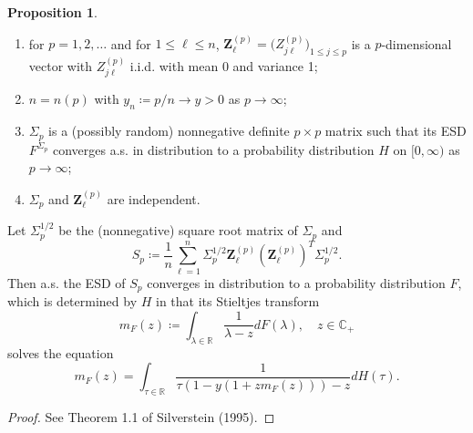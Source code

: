 \documentclass[a4paper,11pt]{book}
\theoremstyle{plain}
\theoremstyle{definition}
\newtheorem{prps}[thm]{Proposition}
\newcommand{\MR}{\mathbb{R}}
\begin{document}
	\begin{prps}\label{MP law} \
		\begin{enumerate}
			\item for $p = 1, 2, \dots$ and for $1 \leq \ell \leq n$, $\mathbf{Z}_{\ell}^{(p)} = \big(Z_{j\ell}^{(p)}\big)_{1 \leq j \leq p}$ is a $p$-dimensional vector with $Z_{j\ell}^{(p)}$ i.i.d. with mean 0 and variance 1;
			\item $n = n(p)$ with $y_n \coloneqq p/n \rightarrow y > 0$ as $p \rightarrow \infty$;
			\item $\Sigma_p$ is a (possibly random) nonnegative definite $p \times p$ matrix such that its ESD $F^{\Sigma_p}$ converges a.s. in distribution to a probability distribution $H$ on $[0,\infty)$ as $p \rightarrow \infty$;
			\item $\Sigma_p$ and $\mathbf{Z}_\ell^{(p)}$ are independent.
		\end{enumerate}
		Let $\Sigma_p^{1/2}$ be the (nonnegative) square root matrix of $\Sigma_p$ and 
		\[S_p\coloneqq \frac{1}{n} \sum_{\ell=1}^{n} \Sigma_p^{1/2} \mathbf{Z}_\ell^{(p)}(\mathbf{Z}_\ell^{(p)})^T \Sigma_p^{1/2}.\]
		Then a.s. the ESD of $S_p$ converges in distribution to a probability distribution $F$, which is determined by $H$ in that its Stieltjes transform
		\[ m_F(z)\coloneqq\int_{\lambda \in \MR} \frac{1}{\lambda - z} dF(\lambda) , \quad z \in \mathbb{C}_+ \]
		solves the equation
		\begin{equation} \label{MP eq}
		m_F(z) = \int_{\tau \in \MR} \frac{1}{\tau (1-y(1+zm_F(z))) - z } dH(\tau).
		\end{equation}
	\end{prps}
	\begin{proof}
		 See Theorem 1.1 of Silverstein (1995).
	\end{proof}
	
\end{document}
